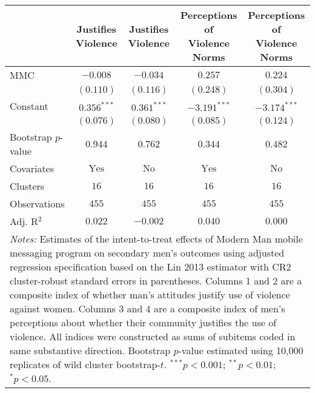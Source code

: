 
\begin{tabular}{l c c c c}
\toprule
 & Justifies Violence & Justifies Violence & \shortstack{Perceptions of \\ Violence Norms} & \shortstack{Perceptions of \\ Violence Norms} \\
\midrule
MMC                 & $-0.008$       & $-0.034$      & $0.257$        & $0.224$        \\
                    & $(0.110)$      & $(0.116)$     & $(0.248)$      & $(0.304)$      \\
Constant            & $0.356^{***}$  & $0.361^{***}$ & $-3.191^{***}$ & $-3.174^{***}$ \\
                    & $(0.076)$      & $(0.080)$     & $(0.085)$      & $(0.124)$      \\
\midrule
Bootstrap $p$-value & $0.944$        & $0.762$       & $0.344$        & $0.482$        \\
Covariates          & $\textrm{Yes}$ & $\textrm{No}$ & $\textrm{Yes}$ & $\textrm{No}$  \\
Clusters            & $16$           & $16$          & $16$           & $16$           \\
Observations        & $455$          & $455$         & $455$          & $455$          \\
Adj. R$^2$          & $0.022$        & $-0.002$      & $0.040$        & $0.000$        \\
\bottomrule
\multicolumn{5}{l}{\scriptsize{\parbox{\linewidth}{\vspace{2pt}
       \textit{Notes:} Estimates of the intent-to-treat effects of Modern Man mobile
       messaging program on secondary men's outcomes using adjusted regression
       specification based on the Lin 2013 estimator with CR2 cluster-robust
       standard errors in parentheses. Columns 1 and 2 are a composite index of
       whether man's attitudes justify use of violence against women. Columns 3 and 4
       are a composite index of men's perceptions about whether their community justifies
       the use of violence. All indices were constructed as sums of subitems coded in
       same substantive direction. Bootstrap $p$-value estimated using 10,000 replicates of 
       wild cluster bootstrap-$t$. \\ $^{***}p<0.001$; $^{**}p<0.01$; $^{*}p<0.05$.}}}
\end{tabular}
